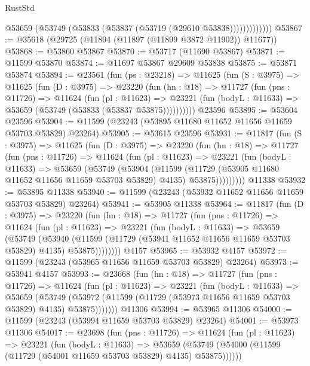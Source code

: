 \begin{lexlean}{RustStd}
\begin{coremodule}
                  @53659 (@53749 (@53833 (@53837 (@53719 (@29610 @53838)))))))))))))
@53867 := @35618 (@29725 (@11894 (@11897 (@11899 @3872 @11902)) @11677))
@53868 := @53860 @53867
@53870 := @53717 (@11690 @53867)
@53871 := @11599 @53870
@53874 := @11697 @53867 @29609 @53838
@53875 := @53871 @53874
@53894 := @23561
    (fun (ps : @23218) =>
    @11625
      (fun (S : @3975) =>
      @11625
        (fun (D : @3975) =>
        @23220
          (fun (hn : @18) =>
          @11727
            (fun (pns : @11726) =>
            @11624
              (fun (pl : @11623) =>
              @23221 (fun (bodyL : @11633) => @53659 (@53749 (@53833 (@53837 @53875))))))))))
    @23596
@53895 := @53604 @23596
@53904 := @11599 (@23243 (@53895 @11680 @11652 @11656 @11659 @53703 @53829) @23264)
@53905 := @53615 @23596
@53931 := @11817
    (fun (S : @3975) =>
    @11625
      (fun (D : @3975) =>
      @23220
        (fun (hn : @18) =>
        @11727
          (fun (pns : @11726) =>
          @11624
            (fun (pl : @11623) =>
            @23221
              (fun (bodyL : @11633) =>
              @53659
                (@53749
                  (@53904
                    (@11599
                      (@11729 (@53905 @11680 @11652 @11656 @11659 @53703 @53829) @4135)
                      @53875)))))))))
    @11338
@53932 := @53895 @11338
@53940 := @11599 (@23243 (@53932 @11652 @11656 @11659 @53703 @53829) @23264)
@53941 := @53905 @11338
@53964 := @11817
    (fun (D : @3975) =>
    @23220
      (fun (hn : @18) =>
      @11727
        (fun (pns : @11726) =>
        @11624
          (fun (pl : @11623) =>
          @23221
            (fun (bodyL : @11633) =>
            @53659
              (@53749
                (@53940
                  (@11599 (@11729 (@53941 @11652 @11656 @11659 @53703 @53829) @4135) @53875))))))))
    @4157
@53965 := @53932 @4157
@53972 := @11599 (@23243 (@53965 @11656 @11659 @53703 @53829) @23264)
@53973 := @53941 @4157
@53993 := @23668
    (fun (hn : @18) =>
    @11727
      (fun (pns : @11726) =>
      @11624
        (fun (pl : @11623) =>
        @23221
          (fun (bodyL : @11633) =>
          @53659
            (@53749
              (@53972 (@11599 (@11729 (@53973 @11656 @11659 @53703 @53829) @4135) @53875)))))))
    @11306
@53994 := @53965 @11306
@54000 := @11599 (@23243 (@53994 @11659 @53703 @53829) @23264)
@54001 := @53973 @11306
@54017 := @23698
    (fun (pns : @11726) =>
    @11624
      (fun (pl : @11623) =>
      @23221
        (fun (bodyL : @11633) =>
        @53659 (@53749 (@54000 (@11599 (@11729 (@54001 @11659 @53703 @53829) @4135) @53875))))))

\end{coremodule}
\end{lexlean}
